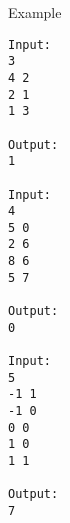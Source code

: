 Example
\begin{verbatim}
Input:
3
4 2
2 1
1 3

Output:
1

Input:
4
5 0
2 6
8 6
5 7

Output:
0

Input:
5
-1 1
-1 0
0 0
1 0
1 1

Output:
7
\end{verbatim}